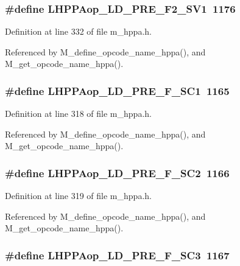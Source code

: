 \subsubsection{\setlength{\rightskip}{0pt plus 5cm}\#define LHPPAop\_\-LD\_\-PRE\_\-F2\_\-SV1~1176}\label{m__hppa_8h_2792c8317b93870903a1805a15594be5}




Definition at line 332 of file m\_\-hppa.h.

Referenced by M\_\-define\_\-opcode\_\-name\_\-hppa(), and M\_\-get\_\-opcode\_\-name\_\-hppa().
\subsubsection{\setlength{\rightskip}{0pt plus 5cm}\#define LHPPAop\_\-LD\_\-PRE\_\-F\_\-SC1~1165}\label{m__hppa_8h_748961b7a6c57cd11ce8bdec46f7ce43}




Definition at line 318 of file m\_\-hppa.h.

Referenced by M\_\-define\_\-opcode\_\-name\_\-hppa(), and M\_\-get\_\-opcode\_\-name\_\-hppa().
\subsubsection{\setlength{\rightskip}{0pt plus 5cm}\#define LHPPAop\_\-LD\_\-PRE\_\-F\_\-SC2~1166}\label{m__hppa_8h_3bbcd2f55226ea1fc06fee5a348b46fd}




Definition at line 319 of file m\_\-hppa.h.

Referenced by M\_\-define\_\-opcode\_\-name\_\-hppa(), and M\_\-get\_\-opcode\_\-name\_\-hppa().
\subsubsection{\setlength{\rightskip}{0pt plus 5cm}\#define LHPPAop\_\-LD\_\-PRE\_\-F\_\-SC3~1167}\label{m__hppa_8h_63faf75ca13474aeaef03766314aa940}




